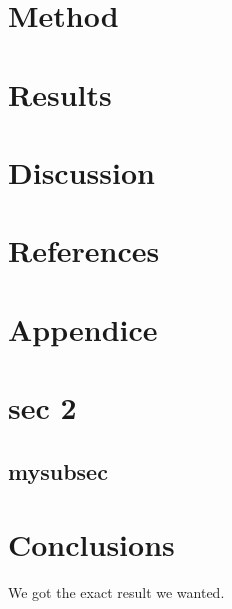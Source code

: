 \documentclass[a4paper,11pt]{article}
\begin{document}
\section{Method}

\section{Results}
\section{Discussion}
\section{References}
\section{Appendice}
\section{sec 2}

\subsection{mysubsec}
\section{Conclusions}
We got the exact result we wanted.
\end{document}
